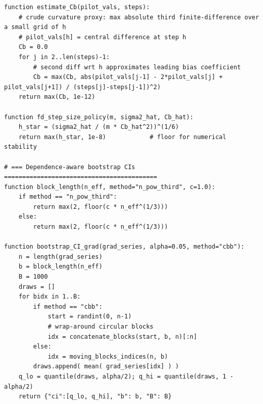 \documentclass[10pt]{article}
\begin{document}
\begin{lstlisting}
function estimate_Cb(pilot_vals, steps):
    # crude curvature proxy: max absolute third finite-difference over a small grid of h
    # pilot_vals[h] = central difference at step h
    Cb = 0.0
    for j in 2..len(steps)-1:
        # second diff wrt h approximates leading bias coefficient
        Cb = max(Cb, abs(pilot_vals[j-1] - 2*pilot_vals[j] + pilot_vals[j+1]) / (steps[j]-steps[j-1])^2)
    return max(Cb, 1e-12)

function fd_step_size_policy(m, sigma2_hat, Cb_hat):
    h_star = (sigma2_hat / (m * Cb_hat^2))^(1/6)
    return max(h_star, 1e-8)            # floor for numerical stability

# === Dependence-aware bootstrap CIs ==========================================
function block_length(n_eff, method="n_pow_third", c=1.0):
    if method == "n_pow_third":
        return max(2, floor(c * n_eff^(1/3)))
    else:
        return max(2, floor(c * n_eff^(1/3)))

function bootstrap_CI_grad(grad_series, alpha=0.05, method="cbb"):
    n = length(grad_series)
    b = block_length(n_eff)
    B = 1000
    draws = []
    for bidx in 1..B:
        if method == "cbb":
            start = randint(0, n-1)
            # wrap-around circular blocks
            idx = concatenate_blocks(start, b, n)[:n]
        else:
            idx = moving_blocks_indices(n, b)
        draws.append( mean( grad_series[idx] ) )
    q_lo = quantile(draws, alpha/2); q_hi = quantile(draws, 1 - alpha/2)
    return {"ci":[q_lo, q_hi], "b": b, "B": B}


\end{lstlisting}
\end{document}
